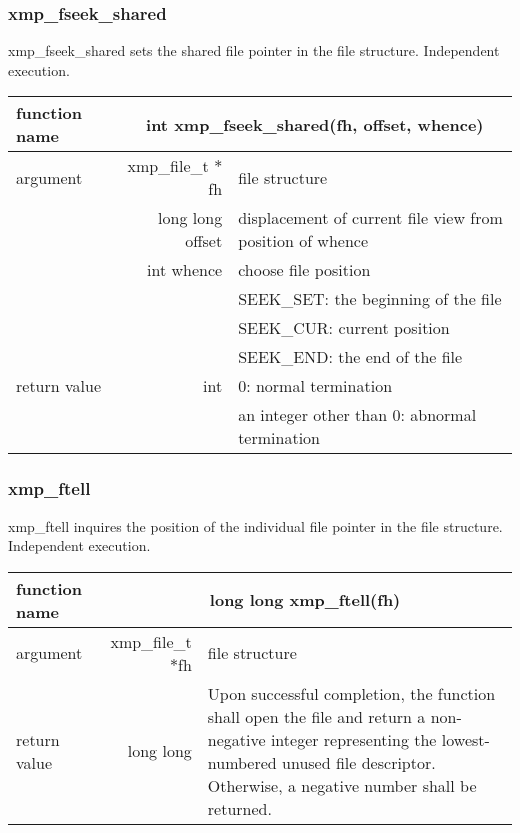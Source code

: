    \subsubsection{xmp\_fseek\_shared}
   xmp\_fseek\_shared sets the shared file pointer in the file structure. Independent execution.

   \begin{table}[h]
    \begin{center}
     \begin{tabular}{|l|r|p{80mm}|}
      \hline
      {\bf function name}  & \multicolumn{2}{c|}{\bf int xmp\_fseek\_shared(fh,
      offset, whence)}  \\ \hline \hline
      argument & xmp\_file\_t $*$fh & file structure \\ \cline{2-3}
      & long long offset & displacement of current file view from
	      position of whence \\ \cline{2-3}
      & int whence & choose file position \\
      &  & SEEK\_SET: the beginning of the file \\ 
      &  & SEEK\_CUR: current position \\ 
      &  & SEEK\_END: the end of the file \\ \hline
      return value & int & 0: normal termination \\
      &  & an integer other than 0: abnormal termination \\ \hline
      \end{tabular}
     \end{center}
    \label{tb:aaa}
   \end{table}

   \subsubsection{xmp\_ftell}
   xmp\_ftell inquires the position of the individual file pointer in the file structure. Independent execution.

   \begin{table}[h]
    \begin{center}
     \begin{tabular}{|l|r|p{80mm}|}
      \hline
      {\bf function name}  & \multicolumn{2}{c|}{\bf long long
      xmp\_ftell(fh)} \\ \hline \hline
      argument & xmp\_file\_t $*$fh & file structure \\ \hline
      return value & long long & Upon successful completion, the
	      function shall open the file and return a non-negative
	      integer representing the lowest-numbered unused file
	      descriptor. Otherwise, a negative number shall be
	      returned. \\ \hline
      \end{tabular}
     \end{center}
    \label{tb:aaa}
   \end{table}

